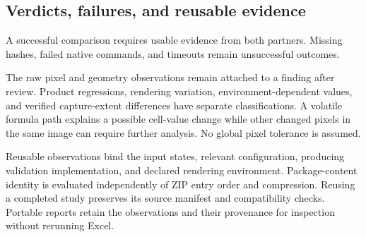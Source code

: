 \subsection{Verdicts, failures, and reusable evidence}
A successful comparison requires usable evidence from both partners. Missing
hashes, failed native commands, and timeouts remain unsuccessful outcomes.

The raw pixel and geometry observations remain attached to a finding after
review. Product regressions, rendering variation, environment-dependent values,
and verified capture-extent differences have separate classifications. A volatile
formula path explains a possible cell-value change while other changed pixels
in the same image can require further analysis. No global pixel tolerance is
assumed.

Reusable observations bind the input states, relevant configuration, producing
validation implementation, and declared rendering environment. Package-content
identity is evaluated independently of ZIP entry order and compression. Reusing
a completed study preserves its source manifest and compatibility checks.
Portable reports retain the observations and their provenance for inspection
without rerunning Excel.